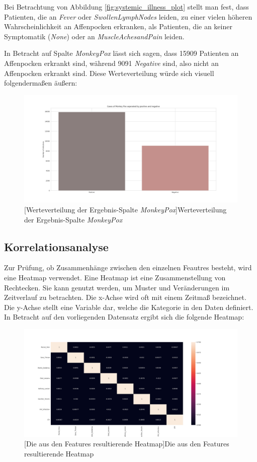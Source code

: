 \documentclass[13pt,a4paper, listof=entryprefix, bibliography=totocnumbered,toc=listofnumbered,lof=listofnumbered]{scrartcl}
\begin{document}
Bei Betrachtung von Abbildung \ref{fig:systemic_illness_plot} stellt man fest, dass Patienten, die an \textit{Fever} oder \textit{Swollen\textunderscore Lymph\textunderscore Nodes} leiden, zu einer
vielen höheren Wahrscheinlichkeit an Affenpocken erkranken, als Patienten, die an keiner Symptomatik (\textit{None}) oder an \textit{Muscle\textunderscore Aches\textunderscore and\textunderscore Pain} leiden.

In Betracht auf Spalte \textit{MonkeyPox} lässt sich sagen, dass 15909 Patienten an Affenpocken erkrankt sind, während 9091 \textit{Negative} sind,
also nicht an Affenpocken erkrankt sind. Diese Werteverteilung würde sich visuell folgendermaßen äußern:

	\begin{figure}[H]
		\centering
		\includegraphics[width=0.8\linewidth]{Bilder/monkey_pox_plot.png}
		[Werteverteilung der Ergebnis-Spalte \textit{MonkeyPox}]{Werteverteilung der Ergebnis-Spalte \textit{MonkeyPox}}
		\label{fig:monkey_pox_plot}
	\end{figure}

	\subsection{Korrelationsanalyse}
		\label{ch:korrleations_analyse}

Zur Prüfung, ob Zusammenhänge zwischen den einzelnen Feautres besteht, wird eine Heatmap verwendet. 
Eine Heatmap ist eine Zusammenstellung von Rechtecken. Sie kann genutzt werden, um Muster und Veränderungen im
Zeitverlauf zu betrachten. Die x-Achse wird oft mit einem Zeitmaß bezeichnet. Die y-Achse stellt eine Variable dar, 
welche die Kategorie in den Daten definiert. In Betracht auf den vorliegenden Datensatz ergibt sich die folgende Heatmap:

	\begin{figure}[H]
		\centering
		\includegraphics[width=0.8\linewidth]{Bilder/heat_map.png}
		[Die aus den Features resultierende Heatmap]{Die aus den Features resultierende Heatmap}
		\label{fig:heatmap}
	\end{figure}
	
\end{document}
